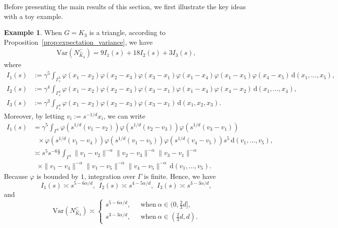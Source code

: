 \documentclass{article}
\theoremstyle{definition}
\newtheorem{example}[theorem]{Example}
\numberwithin{equation}{section}
\theoremstyle{remark}
\newcommand{\Var}{\mathrm{Var}}
\begin{document}
Before presenting the main results of this section, we first illustrate the key ideas with a toy example.
\begin{example}
	When $G=K_3$ is a triangle, according to Proposition~\ref{prop:expectation_variance}, we have
\begin{align*}
\Var(N_{K_3}^{\subset})=9I_1(s)+18I_2(s)+3I_3(s),
\end{align*}
where
\begin{align*}
	I_1(s)&:=\gamma^5\int_{\Gamma_s^5}\varphi(x_1-x_2)\varphi(x_2-x_3)\varphi(x_3-x_1)\varphi(x_1-x_4)\varphi(x_1-x_5)\varphi(x_4-x_5)\,\mathrm{d}(x_1,\dots,x_5),\\
	I_2(s)&:=\gamma^4\int_{\Gamma_s^4}\varphi(x_1-x_2)\varphi(x_2-x_3)\varphi(x_3-x_1)\varphi(x_1-x_4)\varphi(x_4-x_2)\,\mathrm{d}(x_1,\dots,x_4),\\
	I_3(s)&:=\gamma^3\int_{\Gamma_s^3}\varphi(x_1-x_2)\varphi(x_2-x_3)\varphi(x_3-x_1)\,\mathrm{d}(x_1,x_2,x_3).
\end{align*}
Moreover, by letting $v_i:=s^{-1/d}x_i$, we can write 
\begin{align*}
	I_1(s)&=\gamma^5\int_{\Gamma^5}\varphi(s^{1/d}(v_1-v_2))\varphi(s^{1/d}(v_2-v_3))\varphi(s^{1/d}(v_3-v_1))\\
	      &\ \ \ \times\varphi(s^{1/d}(v_1-v_4))\varphi(s^{1/d}(v_1-v_5))\varphi(s^{1/d}(v_4-v_5))s^{5}\,\mathrm{d}(v_1,\dots,v_5),\\
	      &\asymp s^5 s^{-6\frac{\alpha}d}\int_{\Gamma^5}\|v_1-v_2\|^{-\alpha}\|v_2-v_3\|^{-\alpha}\|v_3-v_1\|^{-\alpha}\\
	      &\ \ \ \times\|v_1-v_4\|^{-\alpha}\|v_1-v_5\|^{-\alpha}\|v_4-v_5\|^{-\alpha}\,\mathrm{d}(v_1,\dots,v_5).
\end{align*}
Because $\varphi$ is bounded by $1$, integration over $\Gamma$ is finite. Hence, we have 
\begin{equation}
	I_1(s)\asymp s^{5-6\alpha/d},~~I_2(s)\asymp s^{4-5\alpha/d},~~I_3(s)\asymp s^{3-3\alpha/d},
\end{equation}
and 
\begin{equation}
	\Var(N_{K_3}^{\subset})\asymp
\begin{cases}
	s^{5-6\alpha/d},\ \ \ &\mbox{when}~\alpha\in(0,\frac23d],\\
	s^{3-3\alpha/d},\ \ \ &\mbox{when}~\alpha\in(\frac23d,d).
\end{cases}
\end{equation}
\end{example}
\end{document}
